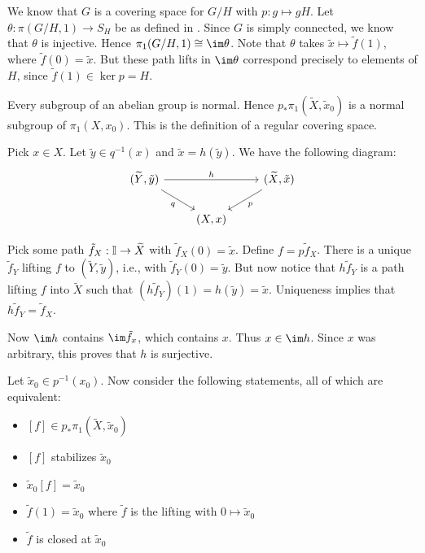 \documentclass[../../solutions.tex]{subfiles}
\begin{document}
\begin{exercise} \leavevmode
We know that $G$ is a covering space for $G/H$ with $p:g\mapsto gH$.
Let $\theta:\pi(G/H,1)\to S_H$ be as defined in .
Since $G$ is simply connected, we know that $\theta$ is injective.
Hence $\pi_1(G/H,1)\cong\im\theta$.
Note that $\theta$ takes $\tilde x\mapsto\tilde f(1)$, where $\tilde f(0)=\tilde x$.
But these path lifts in $\im\theta$ correspond precisely to elements of $H$, since $\tilde f(1)\in\ker p=H$.
\end{exercise}

\begin{exercise} \leavevmode
Every subgroup of an abelian group is normal.
Hence $p_*\pi_1(\widetilde X,\tilde x_0)$ is a normal subgroup of $\pi_1(X,x_0)$.
This is the definition of a regular covering space.
\end{exercise}

\begin{exercise} \leavevmode
Pick $x\in X$.
Let $\tilde y\in q^{-1}(x)$ and $\tilde x=h(\tilde y)$.
We have the following diagram:
\[
\begin{tikzcd}
(\widetilde Y,\tilde y)\ar[rr,"h"]\ar[dr,"q",swap] & & (\widetilde X,\tilde x)\ar[dl,"p"] \\
& (X,x) &
\end{tikzcd}
\]

Pick some path $\tilde f_X:\mathbb I\to\widetilde X$ with $\tilde f_X(0)=\tilde x$.
Define $f=p\tilde f_X$.
There is a unique $\tilde f_Y$ lifting $f$ to $(\widetilde Y,\tilde y)$, i.e., with $\tilde f_Y(0)=\tilde y$.
But now notice that $h\tilde f_Y$ is a path lifting $f$ into $\widetilde X$ such that $(h\tilde f_Y)(1)=h(\tilde y)=\tilde x$.
Uniqueness implies that $h\tilde f_Y=\tilde f_X$.

Now $\im h$ contains $\im\tilde f_x$, which contains $x$.
Thus $x\in\im h$.
Since $x$ was arbitrary, this proves that $h$ is surjective.
\end{exercise}

\begin{exercise} \leavevmode
Let $\tilde x_0\in p^{-1}(x_0)$.
Now consider the following statements, all of which are equivalent:
\begin{itemize}
\item $[f]\in p_*\pi_1(\widetilde X,\tilde x_0)$
\item $[f]$ stabilizes $\tilde x_0$
\item $\tilde x_0[f]=\tilde x_0$
\item $\tilde f(1)=\tilde x_0$ where $\tilde f$ is the lifting with $0\mapsto\tilde x_0$
\item $\tilde f$ is closed at $\tilde x_0$
\end{itemize}
\end{exercise}
\end{document}
